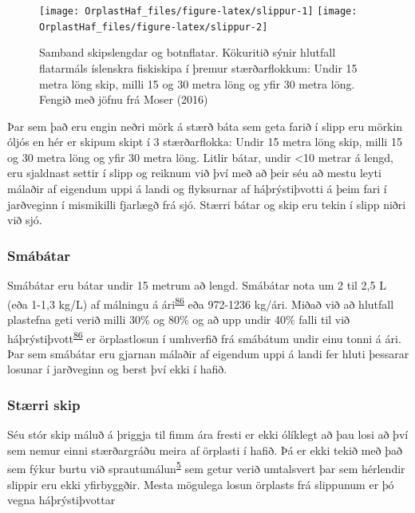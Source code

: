 \documentclass[icelandic,]{book}
\begin{document}
\begin{figure}

{\centering \texttt{[image: OrplastHaf\_files/figure-latex/slippur-1]} \texttt{[image: OrplastHaf\_files/figure-latex/slippur-2]} 

}

\caption{Samband skipslengdar og botnflatar. Kökuritið sýnir hlutfall flatarmáls íslenskra fiskiskipa í þremur stærðarflokkum: Undir 15 metra löng skip, milli 15 og 30 metra löng og yfir 30 metra löng. Fengið með jöfnu frá Moser (2016)}\label{fig:slippur}
\end{figure}

Þar sem það eru engin neðri mörk á stærð báta sem geta farið í slipp eru mörkin óljós en hér er skipum skipt í 3 stærðarflokka: Undir 15 metra löng skip, milli 15 og 30 metra löng og yfir 30 metra löng. Litlir bátar, undir \textless{}10 metrar á lengd, eru sjaldnast settir í slipp og reiknum við því með að þeir séu að mestu leyti málaðir af eigendum uppi á landi og flyksurnar af háþrýstiþvotti á þeim fari í jarðveginn í mismikilli fjarlægð frá sjó. Stærri bátar og skip eru tekin í slipp niðri við sjó.

\hypertarget{smabatar}{%
\subsubsection*{Smábátar}\label{smabatar}}

Smábátar eru bátar undir 15 metrum að lengd. Smábátar nota um 2 til 2,5 L (eða 1-1,3 kg/L) af málningu á ári\textsuperscript{\protect\hyperlink{ref-Verschoor2016}{86}} eða 972-1236 kg/ári. Miðað við að hlutfall plastefna geti verið milli 30\% og 80\% og að upp undir 40\% falli til við háþrýstiþvott\textsuperscript{\protect\hyperlink{ref-Verschoor2016}{86}} er örplastlosun í umhverfið frá smábátum undir einu tonni á ári. Þar sem smábátar eru gjarnan málaðir af eigendum uppi á landi fer hluti þessarar losunar í jarðveginn og berst því ekki í hafið.

\hypertarget{strri-skip}{%
\subsubsection*{Stærri skip}\label{strri-skip}}

Séu stór skip máluð á þriggja til fimm ára fresti er ekki ólíklegt að þau losi að því sem nemur einni stærðargráðu meira af örplasti í hafið. Þá er ekki tekið með það sem fýkur burtu við sprautumálun\textsuperscript{\protect\hyperlink{ref-OECD2009}{5}} sem getur verið umtalsvert þar sem hérlendir slippir eru ekki yfirbyggðir. Mesta mögulega losun örplasts frá slippunum er þó vegna háþrýstiþvottar
\end{document}
